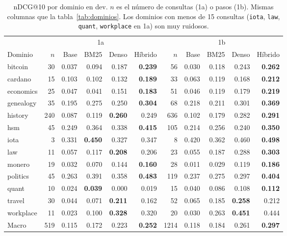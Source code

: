 \documentclass[11pt,a4paper]{article}
\begin{document}
\begin{table}[t]
\centering
\caption{nDCG@10 por dominio en dev. $n$ es el número de consultas (1a) o pasos (1b). Mismas columnas que la tabla~\ref{tab:dominios}. Los dominios con menos de 15 consultas (\texttt{iota}, \texttt{law}, \texttt{quant}, \texttt{workplace} en 1a) son muy ruidosos.}
\label{tab:dominios-dev}
\small
\begin{tabular}{lrrrrrrrrrr}
\toprule
 & \multicolumn{5}{c}{1a} & \multicolumn{5}{c}{1b} \\
Dominio & $n$ & Base & BM25 & Denso & Híbrido & $n$ & Base & BM25 & Denso & Híbrido \\
\midrule
bitcoin   & 30  & 0.037 & 0.094 & 0.187 & \textbf{0.239} & 56  & 0.030 & 0.118 & 0.243 & \textbf{0.262} \\
cardano   & 15  & 0.103 & 0.102 & 0.132 & \textbf{0.189} & 33  & 0.063 & 0.119 & 0.168 & \textbf{0.212} \\
economics & 25  & 0.047 & 0.041 & 0.151 & \textbf{0.183} & 51  & 0.046 & 0.119 & 0.179 & \textbf{0.219} \\
genealogy & 35  & 0.195 & 0.275 & 0.250 & \textbf{0.304} & 68  & 0.218 & 0.211 & 0.301 & \textbf{0.369} \\
history   & 240 & 0.087 & 0.119 & \textbf{0.260} & 0.249 & 636 & 0.102 & 0.179 & 0.282 & \textbf{0.291} \\
hsm       & 45  & 0.249 & 0.364 & 0.338 & \textbf{0.415} & 105 & 0.214 & 0.256 & 0.240 & \textbf{0.350} \\
iota      & 3   & 0.331 & \textbf{0.450} & 0.327 & 0.347 & 8   & 0.420 & 0.362 & 0.460 & \textbf{0.498} \\
law       & 11  & 0.057 & 0.117 & \textbf{0.208} & 0.206 & 23  & 0.055 & 0.187 & 0.288 & \textbf{0.303} \\
monero    & 19  & 0.032 & 0.070 & 0.144 & \textbf{0.160} & 28  & 0.011 & 0.029 & 0.119 & \textbf{0.186} \\
politics  & 45  & 0.263 & 0.391 & 0.358 & \textbf{0.483} & 119 & 0.237 & 0.275 & 0.297 & \textbf{0.404} \\
quant     & 10  & 0.024 & \textbf{0.039} & 0.000 & 0.019 & 15  & 0.040 & 0.086 & 0.108 & \textbf{0.112} \\
travel    & 30  & 0.044 & 0.071 & \textbf{0.211} & 0.162 & 52  & 0.065 & 0.185 & \textbf{0.258} & 0.212 \\
workplace & 11  & 0.023 & 0.100 & \textbf{0.328} & 0.320 & 20  & 0.030 & 0.263 & \textbf{0.451} & 0.444 \\
\midrule
Macro     & 519 & 0.115 & 0.172 & 0.223 & \textbf{0.252} & 1214 & 0.118 & 0.184 & 0.261 & \textbf{0.297} \\
\bottomrule
\end{tabular}
\end{table}
\end{document}
